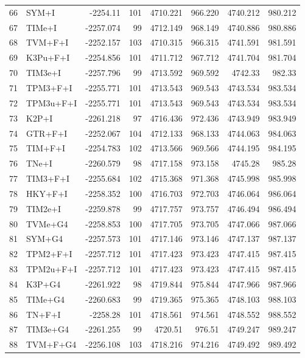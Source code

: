 \begin{longtable}{clrrrrrr}
	66 & SYM+I & -2254.11 & 101 & 4710.221 & 966.220 & 4740.212 & 980.212 \\ 
	67 & TIMe+I & -2257.074 & 99 & 4712.149 & 968.149 & 4740.886 & 980.886 \\ 
	68 & TVM+F+I & -2252.157 & 103 & 4710.315 & 966.315 & 4741.591 & 981.591 \\ 
	69 & K3Pu+F+I & -2254.856 & 101 & 4711.712 & 967.712 & 4741.704 & 981.704 \\ 
	70 & TIM3e+I & -2257.796 & 99 & 4713.592 & 969.592 & 4742.33 & 982.33 \\ 
	71 & TPM3+F+I & -2255.771 & 101 & 4713.543 & 969.543 & 4743.534 & 983.534 \\ 
	72 & TPM3u+F+I & -2255.771 & 101 & 4713.543 & 969.543 & 4743.534 & 983.534 \\ 
	73 & K2P+I & -2261.218 & 97 & 4716.436 & 972.436 & 4743.949 & 983.949 \\ 
	74 & GTR+F+I & -2252.067 & 104 & 4712.133 & 968.133 & 4744.063 & 984.063 \\ 
	75 & TIM+F+I & -2254.783 & 102 & 4713.566 & 969.566 & 4744.195 & 984.195 \\ 
	76 & TNe+I & -2260.579 & 98 & 4717.158 & 973.158 & 4745.28 & 985.28 \\ 
	77 & TIM3+F+I & -2255.684 & 102 & 4715.368 & 971.368 & 4745.998 & 985.998 \\ 
	78 & HKY+F+I & -2258.352 & 100 & 4716.703 & 972.703 & 4746.064 & 986.064 \\ 
	79 & TIM2e+I & -2259.878 & 99 & 4717.757 & 973.757 & 4746.494 & 986.494 \\ 
	80 & TVMe+G4 & -2258.853 & 100 & 4717.705 & 973.705 & 4747.066 & 987.066 \\ 
	81 & SYM+G4 & -2257.573 & 101 & 4717.146 & 973.146 & 4747.137 & 987.137 \\ 
	82 & TPM2+F+I & -2257.712 & 101 & 4717.423 & 973.423 & 4747.415 & 987.415 \\ 
	83 & TPM2u+F+I & -2257.712 & 101 & 4717.423 & 973.423 & 4747.415 & 987.415 \\ 
	84 & K3P+G4 & -2261.922 & 98 & 4719.844 & 975.844 & 4747.966 & 987.966 \\ 
	85 & TIMe+G4 & -2260.683 & 99 & 4719.365 & 975.365 & 4748.103 & 988.103 \\ 
	86 & TN+F+I & -2258.28 & 101 & 4718.561 & 974.561 & 4748.552 & 988.552 \\ 
	87 & TIM3e+G4 & -2261.255 & 99 & 4720.51 & 976.51 & 4749.247 & 989.247 \\ 
	88 & TVM+F+G4 & -2256.108 & 103 & 4718.216 & 974.216 & 4749.492 & 989.492 \\ 

\end{longtable}
